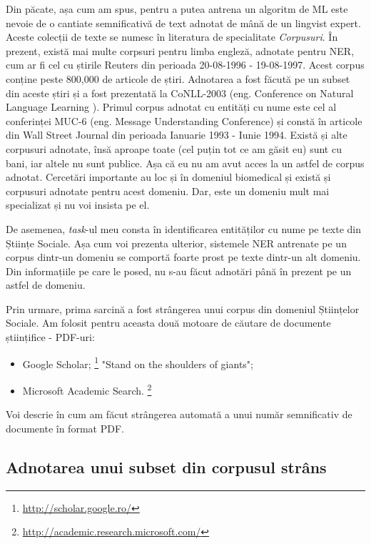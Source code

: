 Din păcate, așa cum am spus, pentru a putea antrena un algoritm de ML este nevoie de o cantiate semnificativă de text adnotat de mână de un lingvist expert. Aceste colecții de texte se numesc în literatura de specialitate \textit{Corpusuri}. În prezent, există mai multe corpsuri pentru limba engleză, adnotate pentru NER, cum ar fi cel cu știrile Reuters din perioada 20-08-1996 - 19-08-1997.\cite{rcv1} Acest corpus conține peste 800,000 de articole de știri. Adnotarea a fost făcută pe un subset din aceste știri și a fost prezentată la CoNLL-2003\cite{conll2003} (eng. Conference on Natural Language Learning ). Primul corpus adnotat cu entități cu nume este cel al conferinței MUC-6 (eng. Message Understanding Conference) și constă în articole din Wall Street Journal din perioada Ianuarie 1993 - Iunie 1994.  Există și alte corpusuri adnotate, însă aproape toate (cel puțin tot ce am găsit eu) sunt cu bani, iar altele nu sunt publice. Așa că eu nu am avut acces la un astfel de corpus adnotat. Cercetări importante au loc și în domeniul biomedical și există și corpusuri adnotate pentru acest domeniu. Dar, este un domeniu mult mai specializat și nu voi insista pe el.

De asemenea, \textit{task}-ul meu consta în identificarea entităților cu nume pe texte din Științe Sociale. Așa cum voi prezenta ulterior, sistemele NER antrenate pe un corpus dintr-un domeniu se comportă foarte prost pe texte dintr-un alt domeniu. Din informațiile pe care le posed, nu s-au făcut adnotări până în prezent pe un astfel de domeniu.

Prin urmare, prima sarcină a fost strângerea unui corpus din domeniul Științelor Sociale. Am folosit pentru aceasta două motoare de căutare de documente științifice - PDF-uri:

\begin{itemize}
\item Google Scholar; \footnote{\url{http://scholar.google.ro/}} "Stand on the shoulders of giants";
\item Microsoft Academic Search. \footnote{\url{http://academic.research.microsoft.com/}}
\end{itemize}

Voi descrie în  cum am făcut strângerea automată a unui număr semnificativ de documente în format PDF.

\subsection{Adnotarea unui subset din corpusul strâns}

